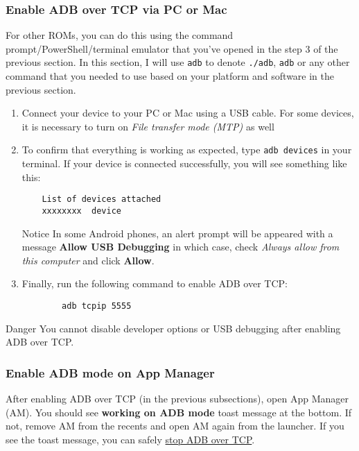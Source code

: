 \subsubsection{Enable ADB over TCP via PC or Mac}\label{subsubsec:enable-adb-over-tcp-via-pc-or-mac}
For other ROMs, you can do this using the command prompt/PowerShell/terminal emulator that you've opened in the step 3
of the previous section. In this section, I will use \texttt{adb} to denote \texttt{./adb}, \texttt{adb} or any other
command that you needed to use based on your platform and software in the previous section.
\begin{enumerate}
    \item Connect your device to your PC or Mac using a USB cable. For some devices, it is necessary to turn on
    \textit{File transfer mode (MTP)} as well
    \item To confirm that everything is working as expected, type \texttt{adb devices} in your terminal. If your device
    is connected successfully, you will see something like this:
    \begin{Verbatim}
    List of devices attached
    xxxxxxxx  device
    \end{Verbatim}
    \begin{tip}{Notice}
        In some Android phones, an alert prompt will be appeared with a message \textbf{Allow USB Debugging}
        in which case, check \textit{Always allow from this computer} and click \textbf{Allow}.
    \end{tip}
    \item Finally, run the following command to enable ADB over TCP:
    \begin{verbatim}
        adb tcpip 5555
    \end{verbatim}
\end{enumerate}

\begin{danger}{Danger}
    You cannot disable developer options or USB debugging after enabling ADB over TCP\@.
\end{danger}

\subsubsection{Enable ADB mode on App Manager}\label{subsubsec:adb-mode-on-app-manager}
After enabling ADB over TCP (in the previous subsections), open App Manager (AM). You should see \textbf{working on ADB
mode} toast message at the bottom. If not, remove AM from the recents and open AM again from the launcher. If you see
the toast message, you can safely \hyperref[subsubsec:stop-adb-over-tcp]{stop ADB over TCP}.

